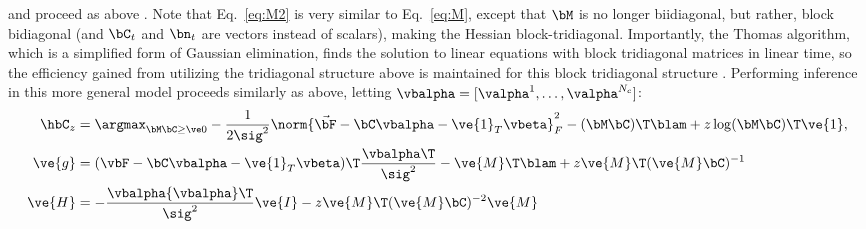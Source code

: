 \noindent and proceed as above%
.  Note that Eq.~\eqref{eq:M2} is very similar to Eq.~\eqref{eq:M}, except that $\bM$ is no longer biidiagonal, but rather, block bidiagonal (and $\bC_t$ and $\bn_t$ are vectors instead of scalars), making the Hessian block-tridiagonal.  Importantly, the Thomas algorithm, which is a simplified form of Gaussian elimination, finds the solution to linear equations with block tridiagonal matrices in linear time, so the efficiency gained from utilizing the tridiagonal structure above is maintained for this block tridiagonal structure \cite{Press92}.   Performing inference in this more general model proceeds similarly as above, letting $\vbalpha=[\valpha^1, \ldots, \valpha^{N_c}]$:
\begin{align} 
\hbC_{\zzz} 
&= \az  -\frac{1}{2 \sig^2} \norm{\vec{\bF} - \bC \vbalpha - \ve{1}_T \vbeta}_F^2 - (\bM \bC )\T \blam  + \zzz \log(\bM \bC)\T\ve{1},  \label{eq:eta5}\\
\ve{g} &= (\vbF - \bC \vbalpha - \ve{1}_T \vbeta)\T\frac{{\vbalpha}\T}{\sig^2} - \ve{M}\T\blam + \zzz \ve{M}\T (\ve{M} \bC)^{-1} \label{eq:g3} \\
\ve{H} &= -\frac{\vbalpha {\vbalpha}\T}{\sig^2} \ve{I} - \zzz \ve{M}\T (\ve{M} \bC)^{-2} \ve{M} \label{eq:H3}
\end{align}
